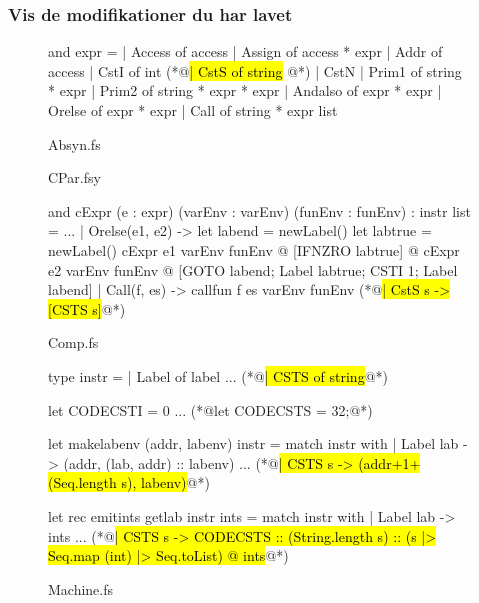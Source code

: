 \subsubsection{Vis de modifikationer du har lavet}
\begin{figure}[!ht]
\begin{FSharp}
and expr =                                                         
  | Access of access
  | Assign of access * expr
  | Addr of access
  | CstI of int 
  (*@\hl{| CstS of string} @*)
  | CstN
  | Prim1 of string * expr
  | Prim2 of string * expr * expr
  | Andalso of expr * expr
  | Orelse of expr * expr 
  | Call of string * expr list
\end{FSharp}
    \caption{Absyn.fs}\label{fig:2016:absyn}
\end{figure}
\begin{figure}[!ht]
    \caption{CPar.fsy}\label{fig:2016:cpar}
\end{figure}
\begin{figure}[!ht]
\begin{FSharp}
and cExpr (e : expr) (varEnv : varEnv) (funEnv : funEnv) : instr list = 
    ...
    | Orelse(e1, e2) -> 
      let labend  = newLabel()
      let labtrue = newLabel()
      cExpr e1 varEnv funEnv
      @ [IFNZRO labtrue]
      @ cExpr e2 varEnv funEnv
      @ [GOTO labend; Label labtrue; CSTI 1; Label labend]
    | Call(f, es) -> callfun f es varEnv funEnv
    (*@\hl{| CstS s -> [CSTS s]}@*)
\end{FSharp}
    \caption{Comp.fs}\label{fig:2016:comp}
\end{figure}
\begin{figure}[!ht]
\begin{FSharp}
type instr =
  | Label of label
  ...
  (*@\hl{| CSTS of string}@*)

let CODECSTI   = 0 
...
(*@let CODECSTS = 32;@*)

let makelabenv (addr, labenv) instr = 
    match instr with
    | Label lab      -> (addr, (lab, addr) :: labenv)
    ...
    (*@\hl{| CSTS s -> (addr+1+(Seq.length s), labenv)}@*)

let rec emitints getlab instr ints = 
    match instr with
    | Label lab      -> ints
    ...
    (*@\hl{| CSTS s -> CODECSTS  :: (String.length s) :: (s |> Seq.map (int) |> Seq.toList) @ ints}@*)
\end{FSharp}
    \caption{Machine.fs}\label{fig:2016:machine}
\end{figure}
